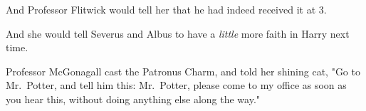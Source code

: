 And Professor Flitwick would tell her that he had indeed received it at 3\PM.

And she would tell Severus and Albus to have a \emph{little} more faith in 
Harry next time.

Professor McGonagall cast the Patronus Charm, and told her shining cat, "Go to 
Mr.~Potter, and tell him this: Mr.~Potter, please come to my office as soon as 
you hear this, without doing anything else along the way."
